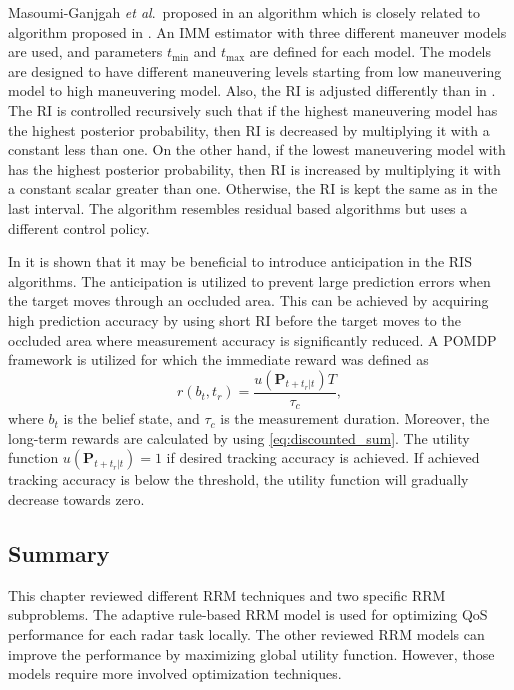 \documentclass[english, 12pt, a4paper, elec, utf8, a-1b, online]{aaltothesis}
\renewcommand{\vec}[1]{\mathbf{#1}}
\newcommand{\etal}{\textit{et al}.~}
\newcommand{\tmax}{t_\text{max}}
\newcommand{\tmin}{t_\text{min}}
\begin{document}
Masoumi-Ganjgah \etal proposed in \cite{MasoumiGanjgah2017} an algorithm which is closely related to algorithm proposed in \cite{Benoudnine2006}.
An IMM estimator with three different maneuver models are used, and parameters $\tmin$ and $\tmax$ are defined for each model.
The models are designed to have different maneuvering levels starting from low maneuvering model to high maneuvering model.
Also, the RI is adjusted differently than in \cite{Benoudnine2006}.
The RI is controlled recursively such that if the highest maneuvering model has the highest posterior probability, then 
RI is decreased by multiplying it with a constant less than one.
On the other hand, if the lowest maneuvering model with has the highest posterior probability, then
RI is increased by multiplying it with a constant scalar greater than one.
Otherwise, the RI is kept the same as in the last interval.
The algorithm resembles residual based algorithms but uses a different control policy.

In \cite{Charlish2015} it is shown that it may be beneficial to introduce anticipation in the RIS algorithms.
The anticipation is utilized to prevent large prediction errors when the target moves through an occluded area.
This can be achieved by acquiring high prediction accuracy by using short RI before the target moves to the occluded area where measurement accuracy is significantly reduced.
A POMDP framework is utilized for which the immediate reward was defined as
\begin{equation}
    r(b_t, t_r) = \frac{u\left(\vec{P}_{t+t_r|t} \right) T}{\tau_c},
\end{equation}
where $b_t$ is the belief state, and $\tau_c$ is the measurement duration.
Moreover, the long-term rewards are calculated by using \eqref{eq:discounted_sum}.
The utility function $u\left(\vec{P}_{t+t_r|t} \right)=1$ if desired tracking accuracy is achieved.
If achieved tracking accuracy is below the threshold, the utility function will gradually decrease towards zero.


\subsection{Summary}

This chapter reviewed different RRM techniques and two specific RRM subproblems.
The adaptive rule-based RRM model is used for optimizing QoS performance for each radar task locally.
The other reviewed RRM models can improve the performance by maximizing global utility function.
However, those models require more involved optimization techniques.
\end{document}
